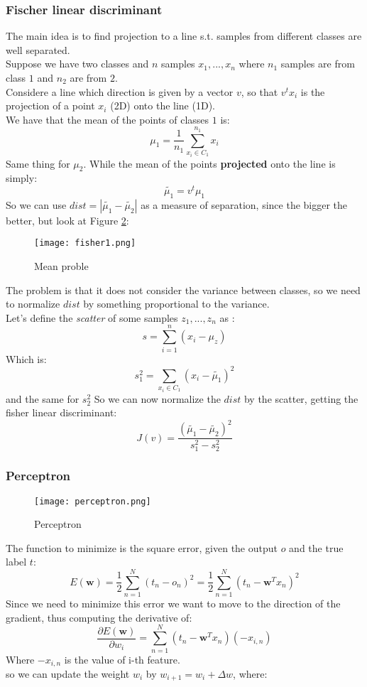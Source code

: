 \subsubsection{Fischer linear discriminant}
The main idea is to find projection to a line s.t. samples from different classes are well separated.\\
Suppose we have two classes and $n$ samples $x_1,...,x_n$ where $n_1$ samples are from class $1$ and $n_2$ are from $2$.\\
Considere a line which direction is given by a vector $v$, so that $v^tx_i$ is the projection of a point $x_i$ (2D) onto the line (1D).\\
We have that the mean of the points of classes $1$ is:
\[\mu_1=\frac{1}{n_1}\sum_{x_i \in C_1}^{n_1}x_i\]
Same thing for $\mu_2$. While the mean of the points \textbf{projected} onto the line is simply:
\[\tilde{\mu_1}=v^t\mu_1\]
So we can use $dist=|\tilde{\mu_1} -\tilde{\mu_2}|$ as a measure of separation, since the bigger the better, but look at Figure \ref{fig:fisher1}:

\begin{figure}[H]
\texttt{[image: fisher1.png]}
\caption{Mean proble}
\label{fig:fisher1}
\end{figure}

The problem is that it does not consider the variance between classes, so we need to normalize $dist$ by something proportional to the variance.\\
Let's define the \textit{scatter} of some samples $z_1,...,z_n$ as :
\[s=\sum_{i=1}^n(x_i-\mu_z)\]
Which is:
\[s_1^2=\sum_{x_i \in C_1}(x_i-\tilde{\mu_1})^2\]
and the same for $s_2^2$
So we can now normalize the $dist$ by the scatter, getting the fisher linear discriminant:
\[J(v)=\frac{(\tilde{\mu_1}-\tilde{\mu_2})^2}{s_1^2-s_2^2}\]

\subsubsection{Perceptron}

\begin{figure}[H]
\texttt{[image: perceptron.png]}
\caption{Perceptron}
\label{fig:fisher1}
\end{figure}

The function to minimize is the square error, given the output $o$ and the true label $t$:
\[E(\bm{w})=\frac{1}{2}\sum_{n=1}^N(t_n-o_n)^2=\frac{1}{2}\sum_{n=1}^N(t_n -\bm{w}^Tx_n)^2\]
Since we need to minimize this error we want to move to the direction of the gradient, thus computing the derivative of:
$$\frac{\partial E(\bm{w}) }{\partial w_i}=\sum_{n=1}^N(t_n-\bm{w}^Tx_n)(-x_{i,n})$$
Where $-x_{i,n}$ is the value of i-th feature.\\
so we can update the weight $w_i$ by $w_{i+1}=w_i + \Delta w$, where:

